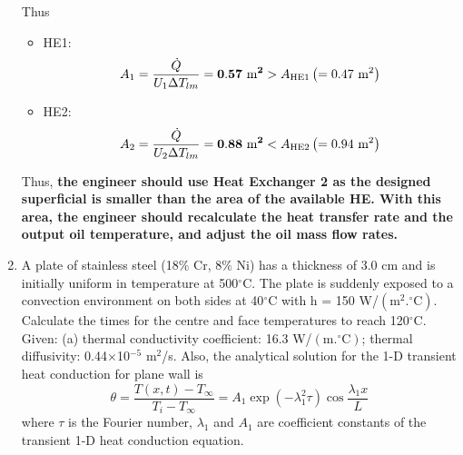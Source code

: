 \documentclass[calculator,steamtables,datasheet,solutions]{exam}
\newcommand{\frc}{\displaystyle\frac}
\begin{document}
\begin{question}
\begin{enumerate}
{Thus
\begin{itemize}
 \item HE1:~ 
   \begin{displaymath}
       A_{1} = \frc{\dot{Q}}{{U_{1}\Delta T_{lm}}} = {\bf 0.57\text{ m}^{2}} > A_{\text{HE1}}\left(=0.47\text{ m}^{2}\right)
   \end{displaymath}
 \item HE2:~
   \begin{displaymath}
       A_{2} = \frc{\dot{Q}}{{U_{2}\Delta T_{lm}}} = {\bf 0.88\text{ m}^{2}} < A_{\text{HE2}}\left(=0.94\text{ m}^{2}\right) 
   \end{displaymath}
\end{itemize}
Thus, {\bf the engineer should use Heat Exchanger 2 as the designed superficial is smaller than the area of the available HE. With this area, the engineer should recalculate the heat transfer rate and the output oil temperature, and adjust the oil mass flow rates.} ~ 
 
}
%

\item\label{Transient_Exam1b} A plate of stainless steel (18$\%$ Cr, 8$\%$ Ni) has a thickness of 3.0 cm and is initially uniform in temperature at 500$^{\circ}$C. The plate is suddenly exposed to a convection environment on both sides at 40$^{\circ}$C with h = 150 W/$\left(\text{m}^{2}.^{\circ}\text{C}\right)$. Calculate the times for the centre and face temperatures to reach 120$^{\circ}$C. Given: (a) thermal conductivity coefficient: 16.3 W/$\left(\text{m}.^{\circ}\text{C}\right)$; thermal diffusivity: 0.44$\times$10$^{-5}$ m$^{2}$/s. Also, the analytical solution for the 1-D transient heat conduction for plane wall is
\begin{displaymath}
 \theta = \frc{T\left(x,t\right)-T_{\infty}}{T_{i}-T_{\infty}} = A_{1}\exp{\left(-\lambda_{1}^{2}\tau\right)}\cos{\frc{\lambda_{1}x}{L}}
\end{displaymath}
where $\tau$ is the Fourier number, $\lambda_{1}$ and $A_{1}$ are coefficient constants of the transient 1-D heat conduction equation.~

\end{enumerate}
\end{question}
\end{document}
